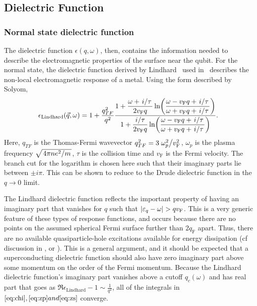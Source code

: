 \documentclass[%
 preprint,
 amsmath,amssymb,
 aps,
]{revtex4-2}
\newcommand{\vf}{v_{\mathrm{F}}}
\begin{document}
\subsection{Dielectric Function} \label{subsec:dielectric}
\subsubsection{Normal state dielectric function} \label{subsubsec:lindharddielectric}
The dielectric function $\epsilon(q, \omega)$, then, contains the information needed to describe the electromagnetic properties of the surface near the qubit.
For the normal state, the dielectric function derived by Lindhard~\cite{Lindhard} used in~\cite{QubitRelax} describes the non-local electromagnetic response of a metal.
Using the form described by Solyom\cite{SolyomV3},
\begin{equation}
	\epsilon_{\mathrm{Lindhard}}(\vec{q}, \omega) = 1 + \frac{q_{TF}^2}{q^2}\frac{\displaystyle 1 + \frac{\omega + \flatfrac{i}{\tau}}{2 \vf q} \ln(\frac{\omega - \vf q + \flatfrac{i}{\tau}}{\omega + \vf q + \flatfrac{i}{\tau}})}{\displaystyle 1 + \frac{\flatfrac{i}{\tau}}{2 \vf q} \ln(\frac{\omega - \vf q + \flatfrac{i}{\tau}}{\omega + \vf q + \flatfrac{i}{\tau}})}. \label{eq:lindhardsolyom}
\end{equation}
Here, $q_{TF}$ is the Thomas-Fermi wavevector $q_{TF}^2 = 3 \flatfrac{\omega_p^2}{\vf^2}$, $\omega_p$ is the plasma frequency $\sqrt{\flatfrac{4 \pi n e^2}{m}}$, $\tau$ is the collision time and $\vf$ is the Fermi velocity.
The branch cut for the logarithm is chosen here such that their imaginary parts lie between $\pm i \pi$.
This can be shown to reduce to the Drude dielectric function in the $q \rightarrow 0$ limit.

The Lindhard dielectric function reflects the important property of having an imaginary part that vanishes for $q$ such that $\abs{\varepsilon_q - \omega} >  q\vf$.
This is a very generic feature of these types of response functions, and occurs because there are no points on the assumed spherical Fermi surface further than $2 q_{\mathrm{F}}$ apart.
Thus, there are no available quasiparticle-hole excitations available for energy dissipation (cf discussion in \cite{AGD}, \cite{FetterWalecka} or \cite{SolyomV3}).
This is a general argument, and it should be expected that a superconducting dielectric function should also have zero imaginary part above some momentum on the order of the Fermi momentum.
Because the Lindhard dielectric function's imaginary part vanishes above a cutoff $q_c\left(\omega\right)$ and has real part that goes as $\Re \epsilon_{\mathrm{Lindhard}} - 1 \sim \frac{1}{q^2}$, all of the integrals in $\eqref{eq:chi}, \eqref{eq:zp} and \eqref{eq:zs}$ converge.
\end{document}

